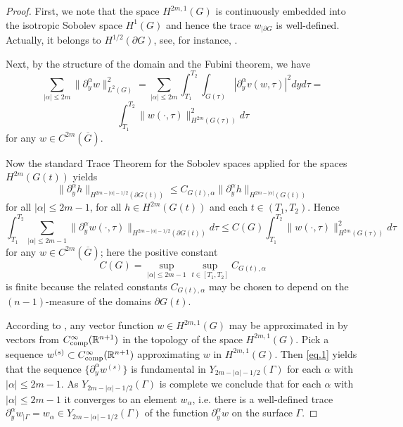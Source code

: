 \documentclass{amsart}
\theoremstyle{definition}
\theoremstyle{remark}
\numberwithin{equation}{section}
\begin{document}
\begin{proof} First, we note that the space ${H}^{2m,1} (G)$  is continuously 
embedded into the isotropic Sobolev space ${H}^{1} (G)$ and hence the trace
$w_{|\partial G}$ is well-defined. Actually, it belongs to ${H}^{1/2} (\partial G)$, 
see, for instance, \cite{BeINi}. 

Next, by the structure of the domain and the Fubini theorem, 
we have 
$$
\sum_{|\alpha| \leq 2m}\|\partial ^\alpha_y w\|^2_{L^2 (G)} = 
\sum_{|\alpha| \leq 2m} 
\int_{T_1}^{T_2} \int_{G (\tau)} |\partial ^\alpha_y v(w,\tau)|^2 dy  d\tau = 
$$
$$ 
\int_{T_1}^{T_2} \| w(\cdot,\tau)\|^2 _{H^{2m} (G(\tau))}  d\tau 
$$
for any $w\in {C}^{2m} (\overline G)$. 

Now the standard Trace  Theorem for the Sobolev spaces applied for the spaces 
$H^{2m} (G(t))$ yields
$$
\|\partial ^\alpha_y h \|_{H^{2m-|\alpha|-1/2} 
(\partial G (t))}\leq C_{G(t),\alpha} \|\partial ^\alpha_y h \|_{H^{2m-|\alpha|} 
(G(t))}
$$
for all $|\alpha|\leq 2m-1$, for all $h \in H^{2m } (G (t))$ and each $t \in (T_1,T_2)$. 
Hence 
\begin{equation} \label{eq.1}
\int_{T_1}^{T_2} \sum_{|\alpha| \leq 2m-1}\|\partial ^\alpha_y w (\cdot ,\tau)\|_{H^{2m-|\alpha|-1/2} 
(\partial G (t))} d\tau \leq C(G) \int_{T_1}^{T_2} \| w(\cdot,\tau)\|^2 _{H^{2m} (G(\tau))}  
d\tau 
\end{equation}
for any $w\in {C}^{2m} (\overline G)$; 
here the positive constant 
$$
C(G)=\sup_{|\alpha|\leq 2m-1}\sup_{t\in [T_1,T_2]} 
C_{G (t),\alpha}
$$ 
is finite because the related constants $C_{G(t),\alpha} $ may be chosen to depend on 
the $(n-1)$-measure of the domains $\partial G (t)$.

According to 
\cite[\S 14]{BeINi}, any vector function $w\in {H}^{2m,1} (G)$ may be approximated 
in by vectors from ${C}_{ {\rm comp}}^\infty  ({\mathbb R}^{n+1})$ in the topology 
of the space ${H}^{2m,1} (G)$. Pick a sequence $w^{(s)}\subset {C}
_{{\rm comp}}^\infty  ({\mathbb R}^{n+1})$ approximating $w$ in ${H}^{2m,1} (G)$. 
Then \eqref{eq.1} yields that the sequence $\{ \partial ^\alpha _y w^{(s)} \}$ is 
fundamental in ${Y}_{2m-|\alpha|-1/2} (\Gamma)$ for each $\alpha$ with 
$|\alpha|\leq 2m-1$. As ${Y}_{2m-|\alpha|-1/2} (\Gamma)$ is complete we conclude 
that for each $\alpha$ with $|\alpha|\leq 2m-1$ it converges to an element $w_\alpha$, i.e. 
there is a well-defined trace $\partial ^
\alpha _y w_{|\Gamma} = w_\alpha \in {Y}_{2m-|\alpha|-1/2} (\Gamma)$ of the function 
$\partial ^\alpha _y w$ on the surface $\Gamma$. 
\end{proof}
\end{document}
